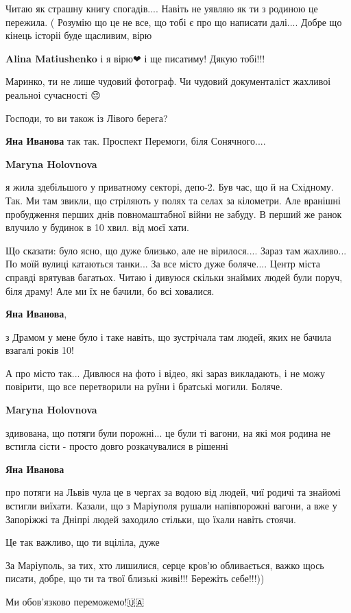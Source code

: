 
Читаю як страшну книгу спогадів.... Навіть не уявляю як ти з родиною це
пережила. ( Розумію що це не все, що тобі є про що написати далі.... Добре що
кінець історіі буде щасливим, вірю 🙏🏻

\begin{itemize} %
\textbf{Alina Matiushenko} і я вірю❤ і ще писатиму!
Дякую тобі!!!
\end{itemize} %



Маринко, ти не лише чудовий фотограф. Чи чудовий документаліст жахливоі
реальноі сучасності 😔


Господи, то ви також із Лівого берега?

\begin{itemize} %
\textbf{Яна Иванова} так так. Проспект Перемоги, біля Сонячного....

\textbf{Maryna Holovnova} 

я жила здебільшого у приватному секторі, депо-2. Був час, що й на Східному.
Так. Ми там звикли, що стріляють у полях та селах за кілометри. Але вранішні
пробудження перших днів повномаштабної війни не забуду. В перший же ранок
влучило у будинок в 10 хвил. від моєї хати.

Що сказати: було ясно, що дуже близько, але не вірилося.... Зараз там
жахливо... По моїй вулиці катаються танки... За все місто дуже боляче.... Центр
міста справді врятував багатьох. Читаю і дивуюся скільки знаймих людей були
поруч, біля драму! Але ми їх не бачили, бо всі ховалися.

\textbf{Яна Иванова}, 

з Драмом у мене було і таке навіть, що зустрічала там людей, яких не бачила взагалі років 10!

А про місто так... Дивлюся на фото і відео, які зараз викладають, і не можу
повірити, що все перетворили на руїни і братські могили. Боляче.

\textbf{Maryna Holovnova} 

здивована, що потяги були порожні... це були ті вагони, на які моя родина не
встигла сісти - просто довго розкачувалися в рішенні

\textbf{Яна Иванова} 

про потяги на Львів чула це в чергах за водою від людей, чиї родичі та знайомі
встигли виїхати. Казали, що з Маріуполя рушали напівпорожні вагони, а вже у
Запоріжжі та Дніпрі людей заходило стільки, що їхали навіть стоячи.

\end{itemize} %


Це так важливо, що ти вціліла, дуже 🙏💛


За Маріуполь, за тих, хто лишилися, серце кров'ю обливається, важко щось
писати, добре, що ти та твої близькі живі!!! Бережіть себе!!!))

Ми обов'язково переможемо!🇺🇦
